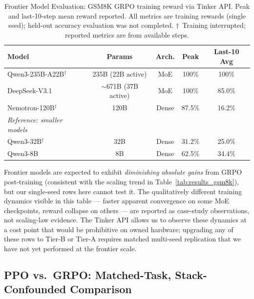\documentclass{article}
\begin{document}
\begin{table}[htbp]
\centering
\caption{Frontier Model Evaluation: GSM8K GRPO training reward via Tinker API.
Peak and last-10-step mean reward reported. All metrics are training rewards
(single seed); held-out accuracy evaluation was not completed.
$\dagger$~Training interrupted; reported metrics are from available steps.}
\label{tab:frontier}
\begin{tabular}{lcccc}
\toprule
\textbf{Model} & \textbf{Params} & \textbf{Arch.} & \textbf{Peak} & \textbf{Last-10 Avg} \\
\midrule
Qwen3-235B-A22B$^\dagger$ & 235B (22B active) & MoE & 100\% & 100\% \\
DeepSeek-V3.1 & $\sim$671B (37B active) & MoE & 100\% & 85.0\% \\
Nemotron-120B$^\dagger$ & 120B & Dense & 87.5\% & 16.2\% \\
\midrule
\textit{Reference: smaller models} & & & & \\
Qwen3-32B$^\dagger$ & 32B & Dense & 31.2\% & 25.0\% \\
Qwen3-8B & 8B & Dense & 62.5\% & 34.4\% \\
\bottomrule
\end{tabular}
\end{table}

Frontier models are expected to exhibit \emph{diminishing absolute gains}
from GRPO post-training (consistent with the scaling trend in
Table~\ref{tab:results_gsm8k}), but our single-seed rows here cannot
test it. The qualitatively different training dynamics visible in this
table --- faster apparent convergence on some MoE checkpoints, reward
collapse on others --- are reported as case-study observations, not
scaling-law evidence. The Tinker API allows us to observe these
dynamics at a cost point that would be prohibitive on owned hardware;
upgrading any of these rows to Tier-B or Tier-A requires matched
multi-seed replication that we have not yet performed at the
frontier scale.

\subsection{PPO vs.~GRPO: Matched-Task, Stack-Confounded Comparison}
\label{sec:ppo_grpo}
\end{document}

